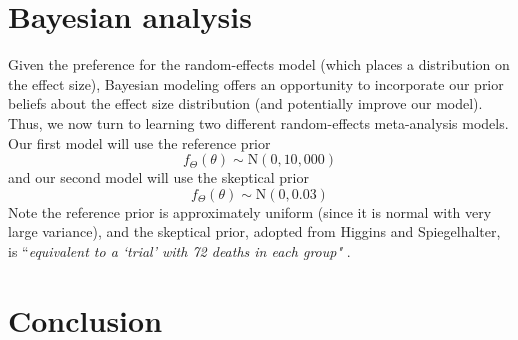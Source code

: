 \documentclass[fleqn,10pt]{SelfArx} %
\begin{document}

\section{Bayesian analysis}

Given the preference for the random-effects model (which places a distribution on the effect size), Bayesian modeling offers an opportunity to incorporate our prior beliefs about the effect size distribution (and potentially improve our model). Thus, we now turn to learning two different random-effects meta-analysis models. Our first model will use the reference prior
\[f_{\Theta}(\theta) \sim \textrm{N}(0, 10,000)\]
and our second model will use the skeptical prior
\[f_{\Theta}(\theta) \sim \textrm{N}(0, 0.03)\]
Note the reference prior is approximately uniform (since it is normal with very large variance), and the skeptical prior, adopted from Higgins  and Spiegelhalter, is ``\emph{equivalent to a `trial' with 72 deaths in each group"} \cite{Origin}.


\section{Conclusion}





\end{document}
